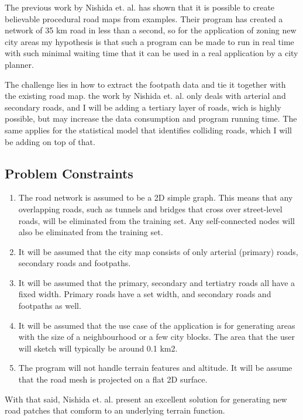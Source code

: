 \documentclass[a4paper]{article}
\begin{document}
The previous work by Nishida et. al. has shown that it is possible to create believable procedural road maps from examples. Their program has created a network of 35 km road in less than a second, so for the application of zoning new city areas my hypothesis is that such a program can be made to run in real time with such minimal waiting time that it can be used in a real application by a city planner.

The challenge lies in how to extract the footpath data and tie it together with the existing road map. the work by Nishida et. al. only deals with arterial and secondary roads, and I will be adding a tertiary layer of roads, wich is highly possible, but may increase the data consumption and program running time. The same applies for the statistical model that identifies colliding roads, which I will be adding on top of that.

\subsection{Problem Constraints}

\begin{enumerate}
\item The road network is assumed to be a 2D simple graph. This means that any overlapping roads, such as tunnels and bridges that cross over street-level roads, will be eliminated from the training set. Any self-connected nodes will also be eliminated from the training set.
\item It will be assumed that the city map consists of only arterial (primary) roads, secondary roads and footpaths.
\item It will be assumed that the primary, secondary and tertiatry roads all have a fixed width. Primary roads have a set width, and secondary roads and footpaths as well.
\item It will be assumed that the use case of the application is for generating areas with the size of a neighbourhood or a few city blocks. The area that the user will sketch will typically be around 0.1 km2.
\item The program will not handle terrain features and altitude. It will be assume that the road mesh is projected on a flat 2D surface.
\end{enumerate}

With that said, Nishida et. al. present an excellent solution for generating new road patches that comform to an underlying terrain function.
\end{document}
